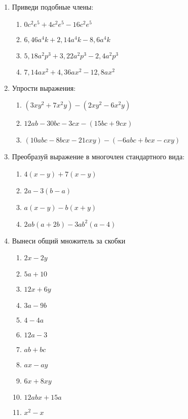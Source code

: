 \documentclass[12pt, a4paper]{article}
\begin{document}
	
 \cfoot{}
\begin{enumerate}
	\item Приведи подобные члены:
	\begin{multicols}{2}
		\begin{enumerate}[label=\textbf{\arabic*)}]
			\item $0c^2e^5+4c^2e^5-16c^2e^5$
			\item $6,46a^4k+2,14a^4k-8,6a^4k$
			\item $5,18a^2p^3+3,22a^2p^3-2,4a^2p^3$
			\item $7,14ax^2+4,36ax^2-12,8ax^2$
		\end{enumerate}
	\end{multicols}
	\item Упрости выражения:
	\begin{enumerate}[label=\textbf{\arabic*)}]
		\item $(3xy^2+7x^2y)-(2xy^2-6x^2y)$
		\item $12ab-30bc-3cx-(15bc+9cx)$
		\item $(10abc-8bcx-21cxy)-(-6abc+bcx-cxy)$
	\end{enumerate}
	\item Преобразуй выражение в многочлен стандартного вида:
	\begin{multicols}{3}
		\begin{enumerate}
			\item $4(x-y)+7(x-y)$
			\item $2a-3(b-a)$
			\item $a(x-y)-b(x+y)$
			\item $2ab(a+2b)-3ab^2(a-4)$
		\end{enumerate}
	\end{multicols}
\item Вынеси общий множитель за скобки
\begin{multicols}{3}
	\begin{enumerate}
		\item $2x-2y$ 
		\item $5a+10$ 
		\item $12x+6y$
		\item $3a-9b$ 
		\item $4-4a$ 
		\item $12a-3$ 
		\item $ab+bc$
		\item $ax-ay$ 
		\item $6x+8xy$
		\item $12abx+15a$ 
		\item $x^2-x$ 

\end{enumerate}
\end{multicols}
\end{enumerate}
\end{document}
